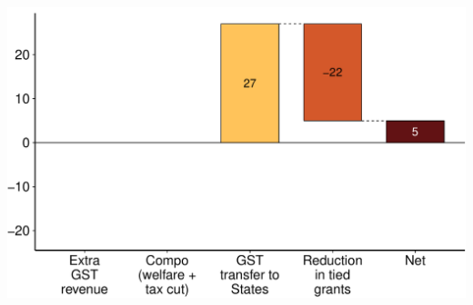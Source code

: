 \documentclass[a4paper,landscape]{article}\usepackage[]{graphicx}\usepackage[]{color}
\newenvironment{knitrout}{}{} %
\begin{document}
\begin{knitrout}
\includegraphics[width=11.000in,height=7.00in]{figure/GST-Figure-11-2} 


\end{knitrout}
\end{document}

